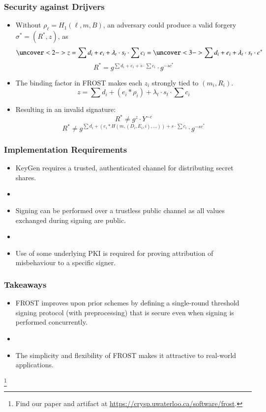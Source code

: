 \documentclass[hyperref={pdfpagelabels=true},table,dvipsnames,14pt,aspectratio=169]{beamer}
\begin{document}
\begin{frame}
  \frametitle{Security against Drijvers}
  \small

  \begin{itemize}
    \item<1->[] Without $\rho_\ell = H_1(\ell, m, B) $,
  an adversary could produce a valid forgery $\sigma^*=(R^*, z)$, as
      \[ \uncover<2-> {z = \sum d_i + e_i + \lambda_t \cdot s_t \cdot \sum c_i} = \uncover<3->
      { \sum d_i + e_i + \lambda_t \cdot s_t \cdot c^*} \]
      \[ R^* = g^{\sum d_i + e_i + s \cdot \sum c_i     } \cdot g^{-s c^*}\]
    \item<4->[] The binding factor in FROST makes each $z_i$ strongly tied to
      $(m_i, R_i)$.
      \[ z = \sum d_i + (e_i * \rho_i) + \lambda_t \cdot s_t \cdot \sum c_i  \]
    \item<5->[] Resulting in an invalid signature:
      \[ R^* \neq g^z \cdot Y^{-c}\]
      \[ R^* \neq g^{\sum d_i + (e_i * H(m, (D_i, E_i, i), \ldots)) + s \cdot \sum c_i     } \cdot g^{-s c^*}\]
  \end{itemize}
\end{frame}


\begin{frame}
  \frametitle{Implementation Requirements}

  \begin{itemize}
    \item<1-> KeyGen requires a trusted, authenticated channel for distributing
      secret shares.
    \item[]
    \item<2-> Signing can be performed over a trustless public channel as all
      values exchanged during signing are public.
    \item[]
    \item<3-> Use of some underlying PKI is required for proving attribution of
      misbehaviour to a specific signer.
  \end{itemize}
\end{frame}



\begin{frame}
  \frametitle{Takeaways}
  \begin{itemize}
    \item<1-> FROST improves upon prior schemes by defining a
      single-round threshold signing protocol (with preprocessing) that is
      secure even when signing is performed concurrently.
    \item[]
    \item<2-> The simplicity and flexibility of FROST makes it attractive to
      real-world applications.
  \end{itemize}
      \let\thefootnote\relax\footnote{
      Find our paper and artifact at
      \url{https://crysp.uwaterloo.ca/software/frost}.
      }
\end{frame}
\end{document}
